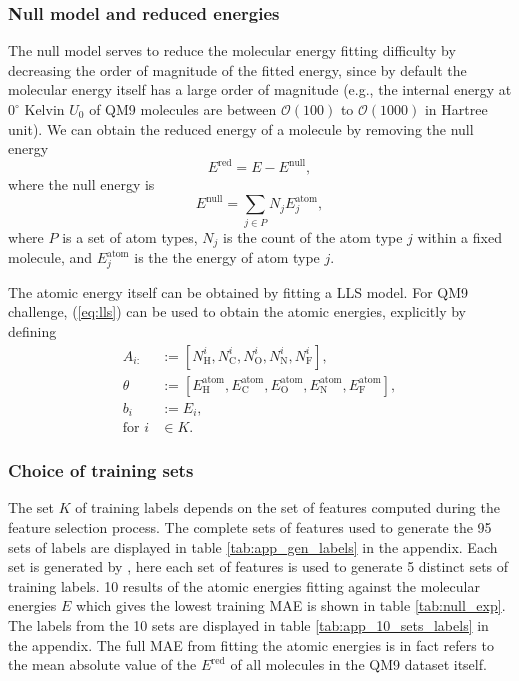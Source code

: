 \documentclass[12pt]{article}
\begin{document}
\subsubsection{Null model and reduced energies}
\label{subsubsec:ered}
The null model serves to reduce the molecular energy fitting difficulty by decreasing the order of magnitude of the fitted energy, since by default the molecular energy itself has a large order of magnitude (e.g., the internal energy at $0^{\circ}$ Kelvin $U_0$ of QM9 molecules are between $\mathcal{O}(100)$ to $\mathcal{O}(1000)$ in Hartree unit). We can obtain the reduced energy of a molecule by removing the null energy
\begin{equation}
	\label{eq:ered}
	E^\text{red} = E - E^\text{null},
\end{equation}
where the null energy is
\begin{equation}
	E^\text{null} = \sum_{j \in P} N_j E^\text{atom}_j,
\end{equation}
where $P$ is a set of atom types, $N_j$ is the count of the atom type $j$ within a fixed molecule, and $E^\text{atom}_j$ is the the energy of atom type $j$.

The atomic energy itself can be obtained by fitting a LLS model. For QM9 challenge, (\ref{eq:lls}) can be used to obtain the atomic energies, explicitly by defining
\begin{equation}
	\label{eq:enull2}
	\begin{split}
		A_{i:} &:= [N^i_\text{H}, N^i_\text{C}, N^i_\text{O}, N^i_\text{N}, N^i_\text{F}], \\
		\theta &:= [E^\text{atom}_\text{H}, E^\text{atom}_\text{C}, E^\text{atom}_\text{O}, E^\text{atom}_\text{N}, E^\text{atom}_\text{F}], \\
		b_i &:= E_i, \\
		\text{for }i &\in K.
	\end{split}
\end{equation}
\subsubsection{Choice of training sets}
The set $K$ of training labels depends on the set of features computed during the feature selection process. The complete sets of features used to generate the 95 sets of labels are displayed in table \ref{tab:app_gen_labels} in the appendix. Each set is generated by , here each set of features is used to generate 5 distinct sets of training labels. 10 results of the atomic energies fitting against the molecular energies $E$ which gives the lowest training MAE is shown in table \ref{tab:null_exp}. The labels from the 10 sets are displayed in table \ref{tab:app_10_sets_labels} in the appendix.
The full MAE from fitting the atomic energies is in fact refers to the mean absolute value of the $E^\text{red}$ of all molecules in the QM9 dataset itself.
\end{document}
